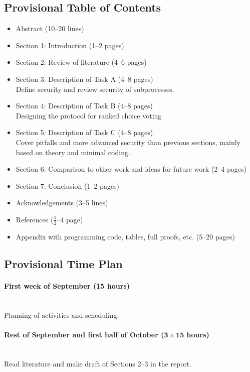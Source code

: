 \documentclass{article}
\newcommand{\timeest}[1]{$\mathbf{#1}$}%
\begin{document}
\subsection*{Provisional Table of Contents}
\begin{itemize}
    \item Abstract (10--20 lines)
    \item Section 1: Introduction (1--2 pages)
    \item Section 2: Review of literature (4--6 pages)
    \item Section 3: Description of Task A (4--8 pages) \\
    Define security and review security of subprocesses.
    \item Section 4: Description of Task B (4--8 pages) \\
    Designing the protocol for ranked choice voting 
    \item Section 5: Description of Task C (4--8 pages) \\
    Cover pitfalls and more advanced security than previous sections, mainly based on theory and minimal coding.
    \item Section 6: Comparison to other work and ideas for future work (2--4 pages)
    \item Section 7: Conclusion (1--2 pages)
    \item Acknowledgements (3--5 lines)
    \item References ($\frac{1}{2}$--4 page)
    \item Appendix with programming code, tables, full proofs, etc. (5--20 pages)
\end{itemize}

\newpage
\subsection*{Provisional Time Plan}

\paragraph{First week of September (15 hours)}~\\\noindent
Planning of activities and scheduling.

\paragraph{Rest of September and first half of October (\timeest{3\times 15} hours)}~\\\noindent
Read literature and make draft of Sections 2--3 in the report.
\end{document}
